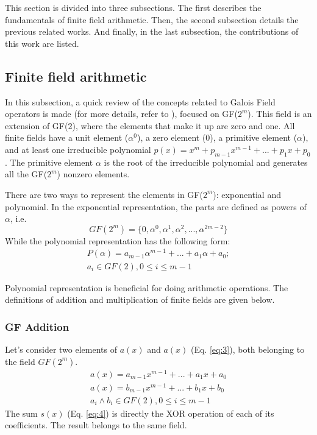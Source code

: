 This section is divided into three subsections. The first describes the fundamentals of finite field arithmetic. 
Then, the second subsection details the previous related works. And finally, in the last subsection, 
the contributions of this work are listed.

\subsection{Finite field arithmetic}

In this subsection, a quick review of the concepts related to Galois Field operators is made (for more details, refer to \cite{deschamps2009hardware}), 
focused on GF($2^m$). This field is an extension of GF(2), where the elements that make it up are zero and one. 
All finite fields have a unit element ($\alpha^0$), a zero element ($0$), a primitive element ($\alpha$), and at least one irreducible polynomial 
$p(x) = x^m + p_{m-1}x^{m-1} + ... + p_{1}x + p_{0}$. The primitive element $\alpha$ is the root of the irreducible polynomial and 
generates all the GF($2^m$) nonzero elements.


There are two ways to represent the elements in GF($2^m$): exponential and polynomial. 
In the exponential representation, the parts are defined as powers of $\alpha$, i.e.
\begin{equation}
 GF (2^m) = \{ 0, \alpha^0, \alpha^1, \alpha^2, ..., \alpha^{2m-2}  \}
 \label{eq:1}
\end{equation}
While the polynomial representation has the following form:
\begin{equation}
\begin{split}
 P(\alpha) = a_{m-1}\alpha^{m-1} + ... + a_{1}\alpha + a_{0};\\ 
 a_{i} \in GF(2), 0 \leq i \leq m-1
 \end{split}
 \label{eq:2}
\end{equation}


Polynomial representation is beneficial for doing arithmetic operations. %
The definitions of addition and multiplication of finite fields are given below.


\subsubsection{GF Addition}
Let's consider two elements of $a(x)$ and $a(x)$ (Eq. \ref{eq:3}), both belonging to the field $GF(2^m)$.
\begin{equation}
\begin{split}
 a(x) = a_{m-1}x^{m-1} + ... + a_{1}x + a_{0}\\
 a(x) = b_{m-1}x^{m-1} + ... + b_{1}x + b_{0}\\
 a_{i} \wedge b_{i} \in GF(2), 0 \leq i \leq m-1
 \end{split}
 \label{eq:3}
\end{equation}
The sum $s(x)$ (Eq. \ref{eq:4}) is directly the XOR operation of each of its coefficients. The result belongs to the same field.

